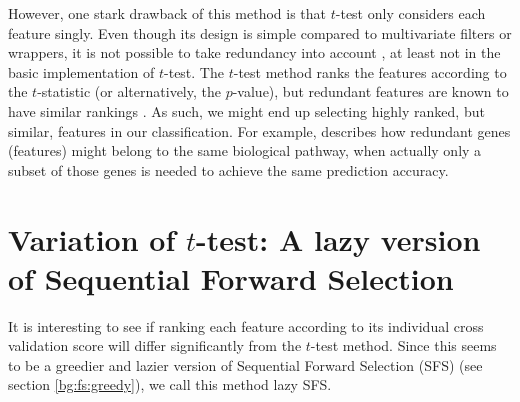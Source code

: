 \documentclass[12pt, twoside, a4paper]{report}
\begin{document}
However, one stark drawback of this method is that $t$-test only considers each feature singly. Even though its design is simple compared to multivariate filters or wrappers, it is not possible to take redundancy into account \cite{RefWorks:217}, at least not in the basic implementation of $t$-test. The $t$-test method ranks the features according to the $t$-statistic (or alternatively, the $p$-value), but redundant features are known to have similar rankings \cite{RefWorks:163}. As such, we might end up selecting highly ranked, but similar, features in our classification. For example, \cite{RefWorks:220} describes how redundant genes (features) might belong to the same biological pathway, when actually only a subset of those genes is needed to achieve the same prediction accuracy.





\section{Variation of $t$-test: A lazy version of Sequential Forward Selection} \label{body:sfs:lazy}

It is interesting to see if ranking each feature according to its individual cross validation score will differ significantly from the $t$-test method. Since this seems to be a greedier and lazier version of Sequential Forward Selection (SFS) (see section \ref{bg:fs:greedy}), we call this method lazy SFS.
\end{document}
